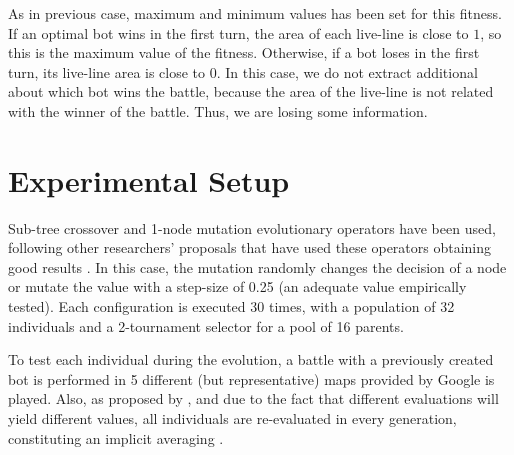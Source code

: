 \documentclass[preprint]{elsarticle}
\begin{document}
As in previous case, maximum and minimum values has been set for this fitness. If an optimal bot wins in the first turn, the area of each live-line is close to {$1$}, so this is the maximum value of the fitness. Otherwise, if a bot loses in the first turn, its live-line area is close to {$0$}. In this case, we do not extract additional about which bot wins the battle, because the area of the live-line is not related with the winner of the battle. Thus, we are losing some information. 


\section{Experimental Setup}
\label{sec:experiments}

Sub-tree crossover and 1-node mutation evolutionary operators have
been used, following other researchers' proposals that have used these
operators obtaining good results \cite{Esparcia2013GPunreal}. In this
case, the mutation randomly changes the decision of a node or mutate
the value with a step-size of 0.25 (an adequate value empirically
tested). Each configuration is executed 30 times, with a population of
32 individuals and a 2-tournament selector for a pool of 16
parents. %

To test each individual during the evolution, a battle with a previously created bot is performed in 5 different (but representative) maps provided by Google is played. 
Also, as proposed by \cite{Genebot_CEC11}, and due to the fact that
different evaluations will yield different values, all individuals are
re-evaluated in every generation, constituting an implicit averaging
 \cite{Jin2005303,DBLP:conf/ijcci/MereloLFGCCRMG15}.
\end{document}
